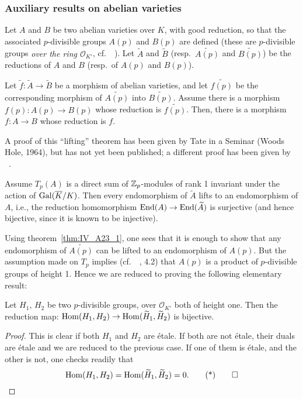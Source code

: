 \begin{subappendices}
\subsubsection{Auxiliary results on abelian varieties}
\label{sec:IV_A23}
Let $A$ and $B$ be two abelian varieties over $K$,
\dpage
with good reduction, so that the associated $p$-divisible groups $A(p)$ and
$B(p)$ are defined (these are $p$-divisible groups \emph{over the ring
$\mathcal{O}_{K'}$}, cf.\ \citeauthor{39}~\cite{39}). Let $\widetilde{A}$ and
$\widetilde{B}$ (resp.\ $\widetilde{A(p)}$ and $\widetilde{B(p)}$) be the
reductions of $A$ and $B$ (resp.\ of $A(p)$ and $B(p)$).

\begin{thm}\label{thm:IV_A23_1}
	Let $\tilde f \colon \widetilde A \to \widetilde B$ be a morphism of
	abelian varieties, and let $\widetilde{f(p)}$ be the corresponding
	morphism of $\widetilde{A(p)}$ into $\widetilde{B(p)}$.  Assume there
	is a morphism $f(p) \colon A(p) \to B(p)$ whose reduction is
	$\widetilde{f(p)}$. Then, there is a morphism $f \colon A \to B$ whose
	reduction is $f$.
\end{thm}
A proof of this ``lifting'' theorem has been given by Tate in a Seminar (Woods
Hole, 1964), but has not yet been published;
a different proof has been given by \citeauthor{messing:crystals}~\cite{messing:crystals}.

\begin{thm}\label{thm:IV_A23_2}
	Assume $T_p(A)$ is a direct sum of $\mathbb{Z}_p$-modules of rank 1 invariant
	under the action of $\operatorname{Gal}(\overline{K}/K)$. Then every endomorphism of
	$\widetilde{A}$ lifts to an endomorphism of $A$, i.e., the reduction
	homomorphism $\operatorname{End}(A) \to \operatorname{End}(\widetilde A)$ is surjective (and hence
	bijective, since it is known to be injective).
\end{thm}
Using theorem~\ref{thm:IV_A23_1}, one sees that it is enough to show that any
endomorphism of $\widetilde{A(p)}$ can be lifted to an endomorphism of $A(p)$.
But the assumption made on $T_p$ implies (cf.\ \citeauthor{39}~\cite{39}, 4.2)
that $A(p)$ is a product of $p$-divisible groups of height 1. Hence we are
reduced to proving the following elementary result:

\begin{lem}
	Let $H_1$, $H_2$ be two $p$-divisible groups, over $\mathcal{O}_{K'}$
	both of height one. Then the reduction map: $\operatorname{Hom}(H_1, H_2) \to
	\operatorname{Hom}(\widetilde{H}_1, \widetilde{H}_2)$ is bijective.
\end{lem}
\begin{proof}
	This is clear if both $H_1$ and $H_2$ are étale.
	\dpage
	If both are not étale, their duals are étale and we are reduced to the
	previous case.  If one of them is étale, and the other is not, one
	checks readily that
	\begin{equation}
		\Hom(H_1, H_2) = \Hom(\widetilde{H}_1, \widetilde{H}_2) = 0.
		\tqedhere
	\end{equation}
\end{proof}


\end{subappendices}
